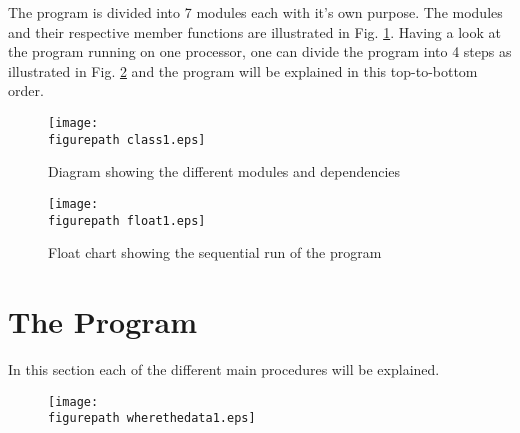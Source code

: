 The program is divided into 7 modules each with it's own purpose. The modules and their respective member functions are illustrated in Fig. \ref{fig:class1}. Having a look at the program running on one processor, one can divide the program into 4 steps as illustrated in Fig. \ref{fig:float1} and the program will be explained in this top-to-bottom order. 

\begin{figure}[h!] 
 \center 
 \texttt{[image: \\figurepath class1.eps]}
 \caption{ Diagram showing the different modules and dependencies \label{fig:class1}}
 \end{figure}

\begin{figure}[h!] 
 \center 
 \texttt{[image: \\figurepath float1.eps]}
 \caption{ Float chart showing the sequential run of the program \label{fig:float1}}
 \end{figure}


\section{The Program  }

In this section each of the different main procedures will be explained.


\begin{figure}[h!] 
 \center 
 \texttt{[image: \\figurepath wherethedata1.eps]}
 \caption{  \label{fig:}}
 \end{figure}


















